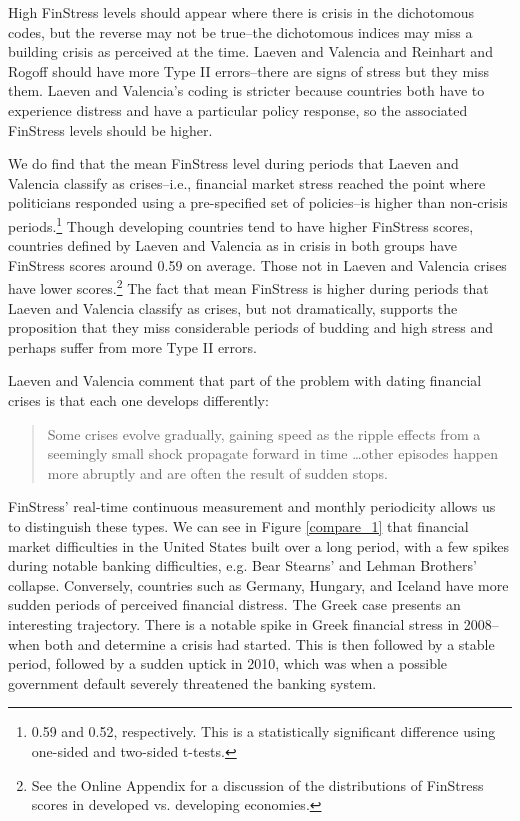 \documentclass[]{article}
\begin{document}
High FinStress levels should appear where there is crisis in the dichotomous codes, but the reverse may not be true--the dichotomous indices may miss a building crisis as perceived at the time. Laeven and Valencia and Reinhart and Rogoff should have more Type II errors--there are signs of stress but they miss them. Laeven and Valencia's coding is stricter because countries both have to experience distress and have a particular policy response, so the associated FinStress levels should be higher.

We do find that the mean FinStress level during periods that Laeven and Valencia classify as crises--i.e., financial market stress reached the point where politicians responded using a pre-specified set of policies--is higher than non-crisis periods.\footnote{0.59 and 0.52, respectively. This is a statistically significant difference using one-sided and two-sided t-tests.} Though developing countries tend to have higher FinStress scores, countries defined by Laeven and Valencia as in crisis in both groups have FinStress scores around 0.59 on average. Those not in Laeven and Valencia crises have lower scores.\footnote{See the Online Appendix for a discussion of the distributions of FinStress scores in developed vs. developing economies.} The fact that mean FinStress is higher during periods that Laeven and Valencia classify as crises, but not dramatically, supports the proposition that they miss considerable periods of budding and high stress and perhaps suffer from more Type II errors.

Laeven and Valencia \citeyearpar[227]{laeven2013} comment that part of the problem with dating financial crises is that each one develops differently:

\begin{quote}
    Some crises evolve gradually, gaining speed as the ripple effects from a seemingly small shock propagate forward in time \ldots other episodes happen more abruptly and are often the result of sudden stops.
\end{quote}

\noindent FinStress' real-time continuous measurement and monthly periodicity allows us to distinguish these types. We can see in Figure \ref{compare_1} that financial market difficulties in the United States built over a long period, with a few spikes during notable banking difficulties, e.g. Bear Stearns' and Lehman Brothers' collapse. Conversely, countries such as Germany, Hungary, and Iceland have more sudden periods of perceived financial distress. The Greek case presents an interesting trajectory. There is a notable spike in Greek financial stress in 2008--when both \cite{Reinhart2009} and \cite{laeven2013} determine a crisis had started. This is then followed by a stable period, followed by a sudden uptick in 2010, which was when a possible government default severely threatened the banking system.
\end{document}
